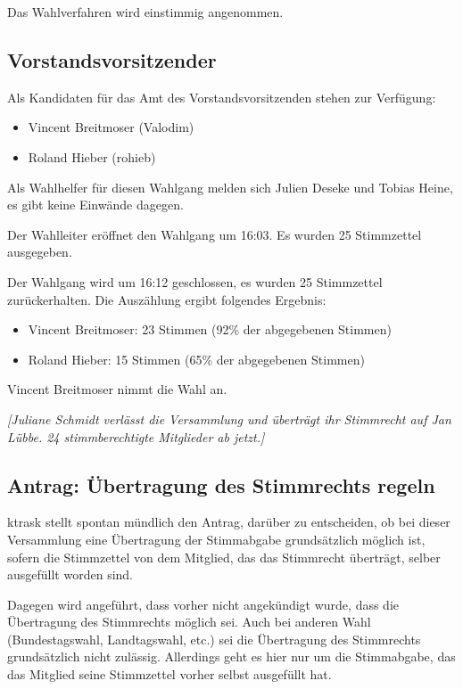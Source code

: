 \documentclass[a4paper,12pt]{scrartcl}
\begin{document}
Das Wahlverfahren wird einstimmig angenommen.

\subsection{Vorstandsvorsitzender}
Als Kandidaten für das Amt des Vorstandsvorsitzenden stehen zur Verfügung:
\begin{itemize}
  \item Vincent Breitmoser (Valodim)
  \item Roland Hieber (rohieb)
\end{itemize}

Als Wahlhelfer für diesen Wahlgang melden sich Julien Deseke und Tobias Heine,
es gibt keine Einwände dagegen.

Der Wahlleiter eröffnet den Wahlgang um 16:03. Es wurden 25 Stimmzettel
ausgegeben.

Der Wahlgang wird um 16:12 geschlossen, es wurden 25 Stimmzettel zurückerhalten.
Die Auszählung ergibt folgendes Ergebnis:

\begin{itemize}
  \item Vincent Breitmoser: 23 Stimmen (92\% der abgegebenen Stimmen)
  \item Roland Hieber: 15 Stimmen (65\% der abgegebenen Stimmen)
\end{itemize}

Vincent Breitmoser nimmt die Wahl an.

\emph{[Juliane Schmidt verlässt die Versammlung und überträgt ihr Stimmrecht auf
Jan Lübbe. 24 stimmberechtigte Mitglieder ab jetzt.]}

\subsection{Antrag: Übertragung des Stimmrechts regeln}
ktrask stellt spontan mündlich den Antrag, darüber zu entscheiden, ob bei dieser
Versammlung eine Übertragung der Stimmabgabe grundsätzlich möglich ist, sofern
die Stimmzettel von dem Mitglied, das das Stimmrecht überträgt, selber
ausgefüllt worden sind.

Dagegen wird angeführt, dass vorher nicht angekündigt wurde, dass die
Übertragung des Stimmrechts möglich sei. Auch bei anderen Wahl (Bundestagswahl,
Landtagswahl, etc.) sei die Übertragung des Stimmrechts grundsätzlich nicht
zulässig. Allerdings geht es hier nur um die Stimmabgabe, das das Mitglied seine
Stimmzettel vorher selbst ausgefüllt hat.
\end{document}
